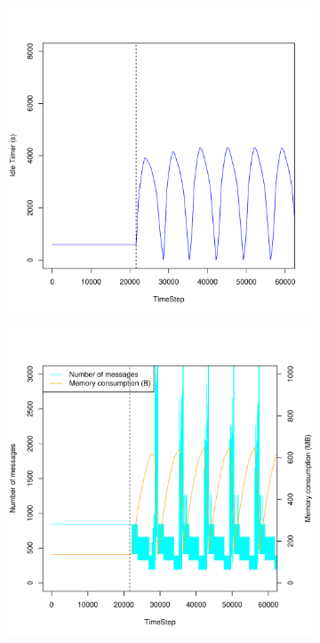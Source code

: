 \documentclass[a4j]{ujarticle}
\begin{document}
\begin{figure}[htbp]
\begin{subfigure}{0.49\hsize}
   \includegraphics[width=1.0\hsize]{scenario_5_idleTimer_86400_345600_5_0_0_0_ideal.pdf}
   \label{subfig:scenario_5_idleTimer_86400_345600_5_0_0_0_ideal}
 \end{subfigure}
 \par\bigskip %
 \begin{subfigure}{0.49\hsize}
   \centering
   \includegraphics[width=1.0\hsize]{scenario_5_signaling_and_memoryload_vs_timeStep_86400_345600_5_0_0_0_ideal.pdf}

\end{subfigure}
\end{figure}
\end{document}

